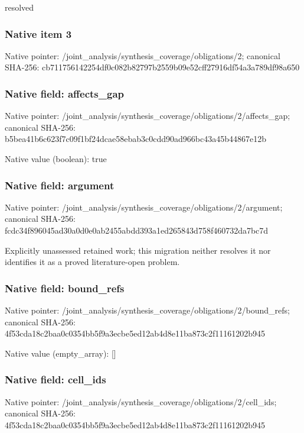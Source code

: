 \documentclass[10pt,a4paper]{article}
\begin{document}
\begingroup\raggedright\sloppy resolved\par\endgroup

\subsubsection{Native item 3}
Native pointer: /joint\_\allowbreak{}analysis/synthesis\_\allowbreak{}coverage/obligations/2; canonical SHA-256: cb711756142254df0c082b82797b2559b09e52cff27916df54a3a789df98a650

\subsubsection{Native field: affects\_\allowbreak{}gap}
Native pointer: /joint\_\allowbreak{}analysis/synthesis\_\allowbreak{}coverage/obligations/2/affects\_\allowbreak{}gap; canonical SHA-256: b5bea41b6c623f7c09f1bf24dcae58ebab3c0cdd90ad966bc43a45b44867e12b

Native value (boolean): true

\subsubsection{Native field: argument}
Native pointer: /joint\_\allowbreak{}analysis/synthesis\_\allowbreak{}coverage/obligations/2/argument; canonical SHA-256: fcdc34f896045ad30a0d0e0ab2455abdd393a1ed265843d758f460732da7bc7d

\begingroup\raggedright\sloppy Explicitly unassessed retained work;\allowbreak{} this migration neither resolves it nor identifies it as a proved literature-open problem.\par\endgroup

\subsubsection{Native field: bound\_\allowbreak{}refs}
Native pointer: /joint\_\allowbreak{}analysis/synthesis\_\allowbreak{}coverage/obligations/2/bound\_\allowbreak{}refs; canonical SHA-256: 4f53cda18c2baa0c0354bb5f9a3ecbe5ed12ab4d8e11ba873c2f11161202b945

Native value (empty\_\allowbreak{}array): []

\subsubsection{Native field: cell\_\allowbreak{}ids}
Native pointer: /joint\_\allowbreak{}analysis/synthesis\_\allowbreak{}coverage/obligations/2/cell\_\allowbreak{}ids; canonical SHA-256: 4f53cda18c2baa0c0354bb5f9a3ecbe5ed12ab4d8e11ba873c2f11161202b945
\end{document}
